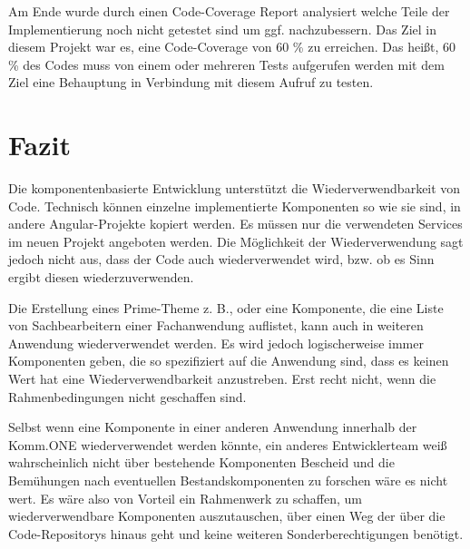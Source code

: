 Am Ende wurde durch einen Code-Coverage Report analysiert welche Teile der Implementierung noch nicht getestet sind um ggf. nachzubessern. Das Ziel in diesem Projekt war es, eine Code-Coverage von 60 \% zu erreichen. Das heißt, 60 \% des Codes muss von einem oder mehreren Tests aufgerufen werden mit dem Ziel eine Behauptung in Verbindung mit diesem Aufruf zu testen.

\chapter{Fazit}

Die komponentenbasierte Entwicklung unterstützt die Wiederverwendbarkeit von Code. Technisch können einzelne implementierte Komponenten so wie sie sind, in andere Angular-Projekte kopiert werden. Es müssen nur die verwendeten Services im neuen Projekt angeboten werden. Die Möglichkeit der Wiederverwendung sagt jedoch nicht aus, dass der Code auch wiederverwendet wird, bzw. ob es Sinn ergibt diesen wiederzuverwenden.

Die Erstellung eines Prime-Theme z. B., oder eine Komponente, die eine Liste von Sachbearbeitern einer Fachanwendung auflistet, kann auch in weiteren Anwendung wiederverwendet werden. Es wird jedoch logischerweise immer Komponenten geben, die so spezifiziert auf die Anwendung sind, dass es keinen Wert hat eine Wiederverwendbarkeit anzustreben. Erst recht nicht, wenn die Rahmenbedingungen nicht geschaffen sind. 

Selbst wenn eine Komponente in einer anderen Anwendung innerhalb der Komm.ONE wiederverwendet werden könnte, ein anderes Entwicklerteam weiß wahrscheinlich nicht über bestehende Komponenten Bescheid und die Bemühungen nach eventuellen Bestandskomponenten zu forschen wäre es nicht wert. Es wäre also von Vorteil ein Rahmenwerk zu schaffen, um wiederverwendbare Komponenten auszutauschen, über einen Weg der über die Code-Repositorys hinaus geht und keine weiteren Sonderberechtigungen benötigt.